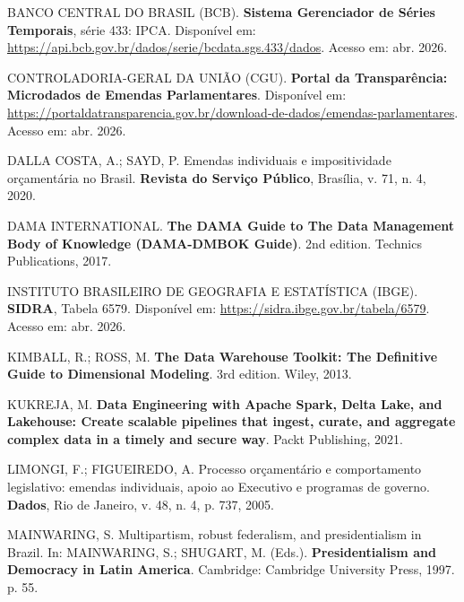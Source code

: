 \documentclass[12pt,a4paper,oneside]{article}
\begin{document}
\begin{singlespace}
\noindent\hangindent=1.25cm
BANCO CENTRAL DO BRASIL (BCB). \textbf{Sistema Gerenciador de Séries
Temporais}, série 433: IPCA. Disponível em:
\url{https://api.bcb.gov.br/dados/serie/bcdata.sgs.433/dados}.
Acesso em: abr. 2026.\par\smallskip

\noindent\hangindent=1.25cm
CONTROLADORIA-GERAL DA UNIÃO (CGU). \textbf{Portal da Transparência:
Microdados de Emendas Parlamentares}. Disponível em:
\url{https://portaldatransparencia.gov.br/download-de-dados/emendas-parlamentares}.
Acesso em: abr. 2026.\par\smallskip

\noindent\hangindent=1.25cm
DALLA COSTA, A.; SAYD, P. Emendas individuais e impositividade
orçamentária no Brasil. \textbf{Revista do Serviço Público},
Brasília, v. 71, n. 4, 2020.\par\smallskip

\noindent\hangindent=1.25cm
DAMA INTERNATIONAL. \textbf{The DAMA Guide to The Data Management Body
of Knowledge (DAMA-DMBOK Guide)}. 2nd edition. Technics Publications,
2017.\par\smallskip

\noindent\hangindent=1.25cm
INSTITUTO BRASILEIRO DE GEOGRAFIA E ESTATÍSTICA (IBGE).
\textbf{SIDRA}, Tabela 6579. Disponível em:
\url{https://sidra.ibge.gov.br/tabela/6579}. Acesso em: abr. 2026.
\par\smallskip

\noindent\hangindent=1.25cm
KIMBALL, R.; ROSS, M. \textbf{The Data Warehouse Toolkit: The
Definitive Guide to Dimensional Modeling}. 3rd edition. Wiley, 2013.
\par\smallskip

\noindent\hangindent=1.25cm
KUKREJA, M. \textbf{Data Engineering with Apache Spark, Delta Lake,
and Lakehouse: Create scalable pipelines that ingest, curate, and
aggregate complex data in a timely and secure way}. Packt Publishing,
2021.\par\smallskip

\noindent\hangindent=1.25cm
LIMONGI, F.; FIGUEIREDO, A. Processo orçamentário e comportamento
legislativo: emendas individuais, apoio ao Executivo e programas de
governo. \textbf{Dados}, Rio de Janeiro, v. 48, n. 4,
p. 737, 2005.\par\smallskip

\noindent\hangindent=1.25cm
MAINWARING, S. Multipartism, robust federalism, and presidentialism
in Brazil. In: MAINWARING, S.; SHUGART, M. (Eds.).
\textbf{Presidentialism and Democracy in Latin America}. Cambridge:
Cambridge University Press, 1997. p. 55.\par\smallskip


\end{singlespace}
\end{document}
